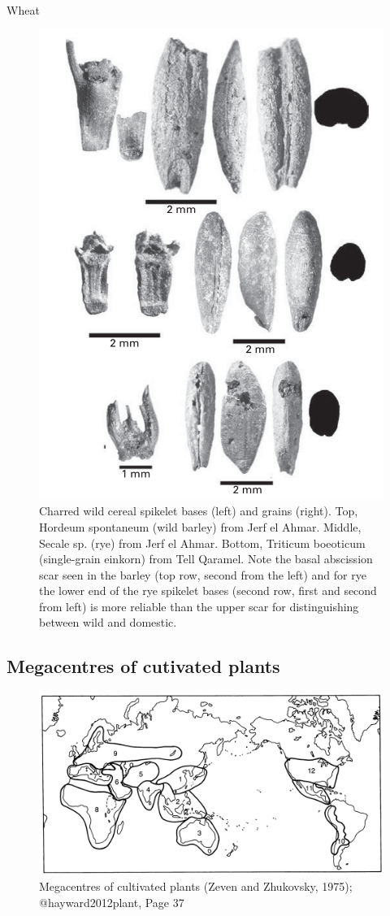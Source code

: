 \documentclass[
  ignorenonframetext,
  aspectratio=169]{beamer}
\begin{document}
\begin{frame}{Wheat}
\protect\hypertarget{wheat}{}
\begin{figure}
\includegraphics[width=0.32\linewidth]{./../images/charred_grass_grains} \caption{Charred wild cereal spikelet bases (left) and grains (right). Top, Hordeum spontaneum (wild barley) from Jerf el Ahmar. Middle, Secale sp. (rye) from Jerf el Ahmar. Bottom, Triticum boeoticum (single-grain einkorn) from Tell Qaramel. Note the basal abscission scar seen in the barley (top row, second from the left) and for rye the lower end of the rye spikelet bases (second row, first and second from left) is more reliable than the upper scar for distinguishing between wild and domestic.}\label{fig:wheat-barley-archaeology}
\end{figure}
\end{frame}

\hypertarget{megacentres-of-cutivated-plants}{%
\subsection{Megacentres of cutivated
plants}\label{megacentres-of-cutivated-plants}}

\begin{frame}{}
\protect\hypertarget{section-16}{}
\begin{figure}
\includegraphics[width=0.6\linewidth]{./../images/megacentres_cultivated} \caption{Megacentres of cultivated plants (Zeven and Zhukovsky, 1975); @hayward2012plant, Page 37}\label{fig:cultivated-megacentres}
\end{figure}
\end{frame}
\end{document}

